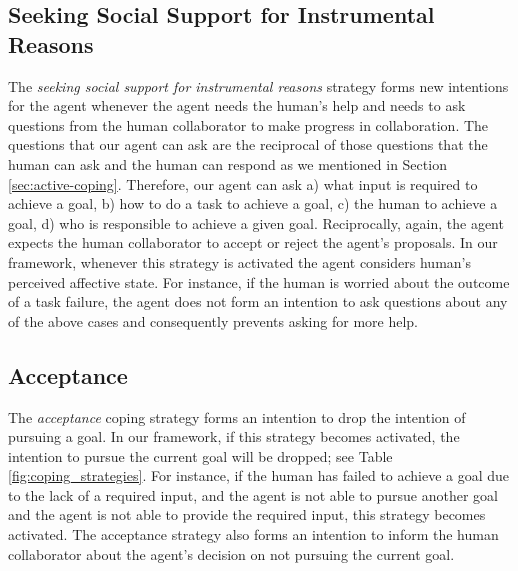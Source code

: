 \documentclass[12pt]{report}
\begin{document}
\subsection{Seeking Social Support for Instrumental Reasons}
The \textit{seeking social support for instrumental reasons} strategy forms new
intentions for the agent whenever the agent needs the human's help and needs to
ask questions from the human collaborator to make progress in collaboration. The
questions that our agent can ask are the reciprocal of those questions that the
human can ask and the human can respond as we mentioned in Section
\ref{sec:active-coping}. Therefore, our agent can ask a) what input is required
to achieve a goal, b) how to do a task to achieve a goal, c) the human to
achieve a goal, d) who is responsible to achieve a given goal. Reciprocally,
again, the agent expects the human collaborator to accept or reject the agent's
proposals. In our framework, whenever this strategy is activated the agent
considers human's perceived affective state. For instance, if the human is worried about
the outcome of a task failure, the agent does not form an intention to ask
questions about any of the above cases and consequently prevents asking for more
help.

\subsection{Acceptance}
The \textit{acceptance} coping strategy forms an intention to drop the
intention of pursuing a goal. In our framework, if this strategy becomes
activated, the intention to pursue the current goal will be dropped; see Table
\ref{fig:coping_strategies}. For instance, if the human has failed
to achieve a goal due to the lack of a required input, and the agent is not able to pursue
another goal and the agent is not able to provide the required input, this
strategy becomes activated. The acceptance strategy also forms an intention to
inform the human collaborator about the agent's decision on not pursuing the
current goal.
\end{document}
